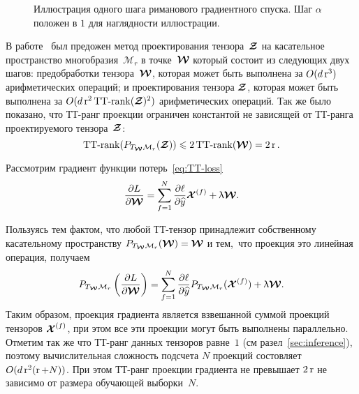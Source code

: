 \begin{figure}[t]
\begin{center}
  \resizebox{0.3\textwidth}{!}{
  \def\svgwidth{7cm}
  \normalsize
  
  }
  \caption{Иллюстрация одного шага риманового градиентного спуска. Шаг $\alpha$ положен в $1$ для наглядности иллюстрации. \label{fig:riemannian-illustration}}
  \end{center}
\end{figure}

В работе~\cite{lubich2015time} был предожен метод проектирования тензора~$\boldsymbol{\mathcal{Z}}$ на касательное пространство многобразия~$\mathcal{M}_r$ в точке~$\boldsymbol{\mathcal{W}}$ который состоит из следующих двух шагов: предобработки тензора~$\boldsymbol{\mathcal{W}}$, которая может быть выполнена за $O(d \operatorname{r}^3)$ арифметических операций; и проектирования тензора $\boldsymbol{\mathcal{Z}}$, которая может быть выполнена за $O(d \operatorname{r}^2 \operatorname{TT-rank}(\boldsymbol{\mathcal{Z}})^2)$ арифметических операций.
Так же было показано, что ТТ-ранг проекции ограничен константой не зависящей от ТТ-ранга проектируемого тензора~$\boldsymbol{\mathcal{Z}}$:
\begin{equation*}
   \operatorname{TT-rank}(P_{T_{\boldsymbol{\mathcal{W}}} \mathcal{M}_r}(\boldsymbol{\mathcal{Z}})) \leqslant 2 \operatorname{TT-rank}(\boldsymbol{\mathcal{W}}) = 2 \operatorname{r}.
\end{equation*}

Рассмотрим градиент функции потерь~\eqref{eq:TT-loss}
\begin{equation}
\label{eq:TT-gradient}
\frac{\partial L}{\partial \boldsymbol{\mathcal{W}}} = \sum_{f=1}^N \frac{\partial \ell}{\partial \widehat{y}} \boldsymbol{\mathcal{X}}^{(f)} + \uplambda \boldsymbol{\mathcal{W}}.
\end{equation}

Пользуясь тем фактом, что любой ТТ-тензор принадлежит собственному касательному пространству $P_{T_{\boldsymbol{\mathcal{W}}} \mathcal{M}_r}(\boldsymbol{\mathcal{W}}) = \boldsymbol{\mathcal{W}}$ и тем, что проекция это линейная операция, получаем
\begin{equation}
\label{eq:riemannian-gradient}
P_{T_{\boldsymbol{\mathcal{W}}} \mathcal{M}_r}\left ( \frac{\partial L}{\partial \boldsymbol{\mathcal{W}}} \right) = \sum_{f=1}^N \frac{\partial \ell}{\partial \widehat{y}} P_{T_{\boldsymbol{\mathcal{W}}} \mathcal{M}_r}(\boldsymbol{\mathcal{X}}^{(f)}) + \uplambda \boldsymbol{\mathcal{W}}.
\end{equation}
Таким образом, проекция градиента является взвешанной суммой проекций тензоров $\boldsymbol{\mathcal{X}}^{(f)}$, при этом все эти проекции могут быть выполнены параллельно.
Отметим так же что ТТ-ранг данных тензоров равне~$1$ (см разел~\ref{sec:inference}), поэтому вычислительная сложность подсчета $N$ проекций состовляет $O(d \operatorname{r}^2 (\operatorname{r} + N))$.
При этом ТТ-ранг проекции градиента  не превышает $2 \operatorname{r}$ не зависимо от размера обучающей выборки~$N$.

